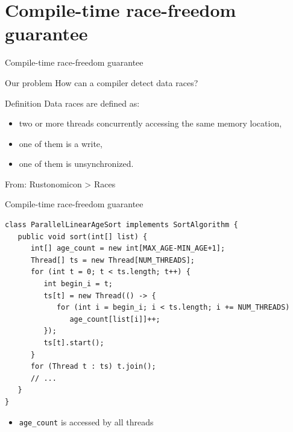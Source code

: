 \documentclass{beamer}
\begin{document}

\section{Compile-time race-freedom\\ guarantee}


\begin{frame}{Compile-time race-freedom guarantee}
	\begin{block}{Our problem}
	How can a compiler detect data races?
	\end{block}
	\pause
	\begin{block}{Definition}
	Data races are defined as:
	\begin{itemize}
		\item two or more threads concurrently accessing 
		{\color{blue} the same memory location},
		\item one of them {\color{blue} is a write},
		\item one of them {\color{blue} is unsynchronized}.
	\end{itemize}
	\raggedleft From: Rustonomicon > Races
	\end{block}
\end{frame}

\begin{frame}[fragile]{Compile-time race-freedom guarantee}
	\begin{lstlisting}
class ParallelLinearAgeSort implements SortAlgorithm {
   public void sort(int[] list) {
      int[] age_count = new int[MAX_AGE-MIN_AGE+1];
      Thread[] ts = new Thread[NUM_THREADS];
      for (int t = 0; t < ts.length; t++) {
         int begin_i = t;
         ts[t] = new Thread(() -> {
            for (int i = begin_i; i < ts.length; i += NUM_THREADS)
               age_count[list[i]]++;
         });
         ts[t].start();
      }
      for (Thread t : ts) t.join();
      // ...
   }
}
	\end{lstlisting}
	\begin{itemize}
	\item \texttt{age\_count} is accessed by all threads
	\end{itemize}
\end{frame}

\end{document}
